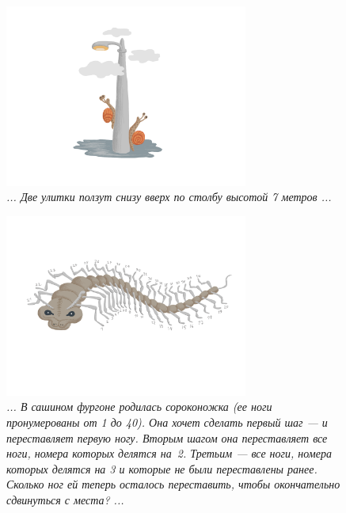 \documentclass[10pt]{scrbook} \usepackage{modules/nonstahp_book}
\begin{document}
\begin{figure} \begin{center}
	\includegraphics[width=8cm]{figures/color/07}
	\caption{
             {\itshape ... Две улитки ползут снизу вверх по столбу высотой 7 метров ...}\\
             }
\end{center} \end{figure}

\begin{figure} \begin{center}
	\includegraphics[width=8cm]{figures/color/08}
	\caption{
             {\itshape ... В сашином фургоне родилась сороконожка (ее ноги пронумерованы от 1 до 40). 
              Она хочет сделать первый шаг — и переставляет первую ногу. 
              Вторым шагом она переставляет все ноги, номера которых делятся на~2. 
              Третьим — все ноги, номера которых делятся на 3 и которые не были переставлены ранее. 
              Сколько ног ей теперь осталось переставить, чтобы окончательно сдвинуться с места? ...}\\
             }
\end{center} \end{figure}
\end{document}
